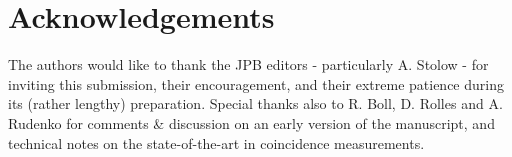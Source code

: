 \section{Acknowledgements}

The authors would like to thank the JPB editors - particularly A. Stolow - for inviting this submission, their encouragement, and their extreme patience during its (rather lengthy) preparation. Special thanks also to R. Boll, D. Rolles and A. Rudenko for comments \& discussion on an early version of the manuscript, and technical notes on the state-of-the-art in coincidence measurements.